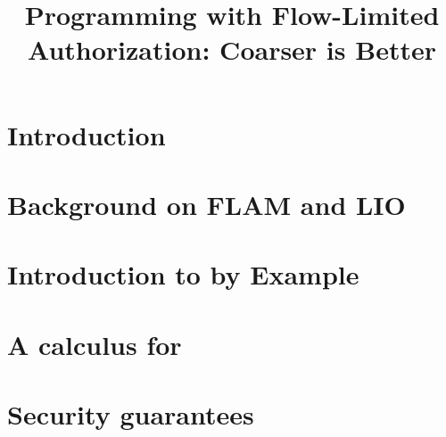\documentclass[conference]{IEEEtran}
\def\review{1}
\begin{document}
\title{Programming with Flow-Limited Authorization: Coarser is Better}

\ifx\review\undefined
\author{
\and
{}
}
\else
\fi

\maketitle




\section{Introduction}\label{sec:introduction}


\section{Background on FLAM and LIO}\label{sec:background}



\section{Introduction to \lang{} by Example}\label{sec:programming}



\section{A calculus for \lang}\label{sec:calculus}



\section{Security guarantees}\label{sec:guarantees}
\end{document}
